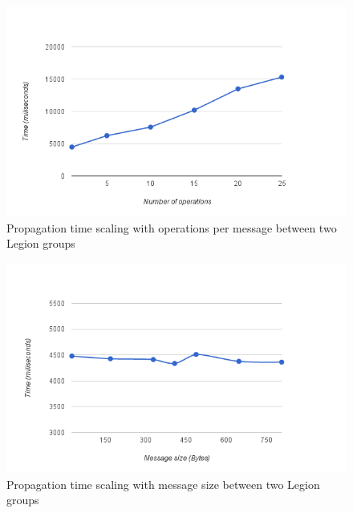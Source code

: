 \begin{figure}[h]
\centering
\includegraphics[scale=0.7]{files/chart4.png}
\caption{Propagation time scaling with operations per message between two Legion groups}
\label{chart4}
\end{figure}

\begin{figure}[H]
\centering
\includegraphics[scale=0.7]{files/chart5.png}
\caption{Propagation time scaling with message size between two Legion groups}
\label{chart5}
\end{figure}

